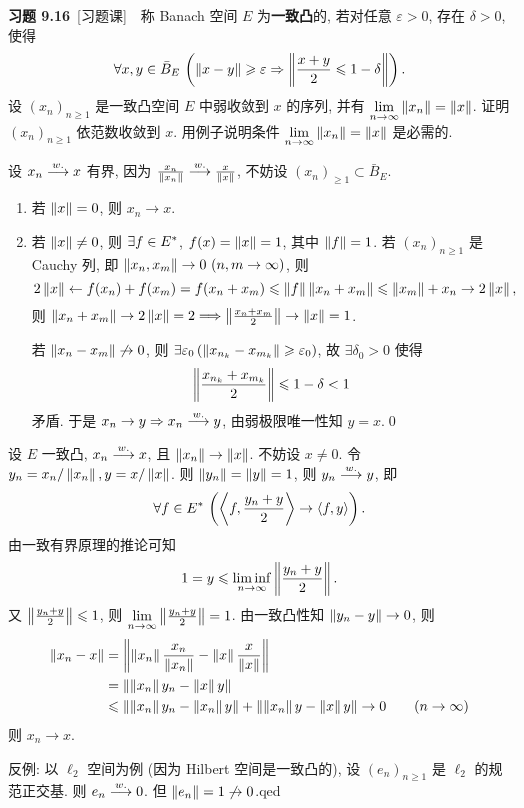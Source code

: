 	\textbf{习题 9.16}\ [习题课]\ \ 称 Banach 空间 $ E $ 为\textbf{一致凸}的, 若对任意 $ \varepsilon>0 $, 存在 $ \delta>0 $, 使得
	\[
		\forall x, y\in\bar{B}_{E}\,\left(\left\| x-y \right\|\geqslant\varepsilon\Rightarrow \left\| \frac{x+y}{2}\leqslant 1-\delta \right\|\right).
	\]
	设 $ (x_{n})_{n\geqslant1} $ 是一致凸空间 $ E $ 中弱收敛到 $ x $ 的序列, 并有 $ \lim\limits_{n\to\infty}\left\| x_{n} \right\|=\left\| x \right\| $. 证明 $ (x_{n})_{n\geqslant1} $ 依范数收敛到 $ x $. 用例子说明条件 $ \lim\limits_{n\to\infty}\left\| x_{n} \right\|=\left\| x \right\| $ 是必需的.
	\begin{Proof}
		设 $ x_{n}\overset{w.}{\longrightarrow} x $ 有界, 因为 $ \frac{x_{n}}{\left\| x_{n} \right\|}\overset{w.}{\longrightarrow}\frac{x}{\left\| x \right\|} $, 不妨设 $ (x_{n})_{\geqslant1}\subset\bar{B}_{E} $.
		\begin{enumerate}[(1)]
			\item 若 $ \left\| x \right\|=0 $, 则 $ x_{n}\to x $.
			\item 若 $ \left\| x \right\|\ne 0 $, 则 $ \exists f\in E^{*} $, $ f(x)=\left\| x \right\|=1 $, 其中 $ \left\| f \right\|=1 $. 若 $ (x_{n})_{n\geqslant1} $ 是 Cauchy 列, 即 $ \norm{x_{n}, x_{m}}\to 0\ (n, m\to\infty) $, 则
			\[
				2\left\| x \right\|\leftarrow f(x_{n})+f(x_{m})=f(x_{n}+x_{m})\leqslant\left\| f \right\|\left\| x_{n}+x_{m} \right\|\leqslant\left\| x_{m} \right\|+x_{n}\to 2\left\| x \right\|,
			\]
			则 $ \left\| x_{n}+x_{m} \right\|\to 2\left\| x \right\|=2\Longrightarrow \left\| \frac{x_{n}+x_{m}}{2} \right\|\to \left\| x \right\|=1 $.

			若 $ \left\| x_{n}-x_{m} \right\|\not\to 0 $, 则 $ \exists\varepsilon_{0}\,(\left\| x_{n_{k}}-x_{m_{k}} \right\|\geqslant\varepsilon_{0}) $, 故 $ \exists \delta_{0}>0 $ 使得
			\[
				\left\| \frac{x_{n_{k}}+x_{m_{k}}}{2} \right\|\leqslant1-\delta<1
			\]
			矛盾. 于是 $ x_{n}\to y\Rightarrow x_{n}\overset{w.}{\longrightarrow} y $, 由弱极限唯一性知 $ y=x $.\qed
		\end{enumerate}
	\end{Proof}
	\begin{Proof}[另证]
		设 $ E $ 一致凸, $ x_{n}\overset{w.}{\longrightarrow} x $, 且 $ \left\| x_{n} \right\|\to\left\| x \right\| $. 不妨设 $ x\ne 0 $. 令 $ y_{n}=x_{n}/\left\| x_{n} \right\|, y=x/\left\| x \right\| $. 则 $ \left\| y_{n} \right\|=\left\| y \right\|=1 $, 则 $ y_{n}\overset{w.}{\longrightarrow} y $, 即
		\[
			\forall f\in E^{*}\,\left( \left\langle f, \frac{y_{n}+y}{2} \right\rangle\to \left\langle f, y \right\rangle \right).
		\]
		由一致有界原理的推论可知
		\[
			1=y\leqslant\liminf_{n\to\infty}\left\| \frac{y_{n}+y}{2} \right\|.
		\]
		又 $ \left\| \frac{y_{n}+y}{2} \right\|\leqslant1 $, 则 $ \lim\limits_{n\to\infty}\left\| \frac{y_{n}+y}{2} \right\|=1 $. 由一致凸性知 $ \left\| y_{n}-y \right\|\to 0 $, 则
		\[
			\begin{aligned}
				\left\| x_{n}-x \right\| & = \left\| \left\| x_{n} \right\|\frac{x_{n}}{\left\| x_{n} \right\|}-\left\| x \right\|\frac{x}{\left\| x \right\|} \right\|\\
				& = \left\| \left\| x_{n} \right\|y_{n}-\left\| x \right\|y \right\|\\
				& \leqslant\left\| \left\| x_{n} \right\|y_{n}-\left\| x_{n} \right\|y \right\|+\left\| \left\| x_{n} \right\|y-\left\| x \right\|y \right\|\to 0\qquad (n\to\infty)
			\end{aligned}
		\]
		则 $ x_{n}\to x $.

		反例: 以 $ \ell_{2} $ 空间为例 (因为 Hilbert 空间是一致凸的), 设 $ (e_{n})_{n\geqslant1} $ 是 $ \ell_{2} $ 的规范正交基. 则 $ e_{n}\overset{w.}{\longrightarrow} 0 $. 但 $ \left\| e_{n} \right\|=1\not\to 0 $.qed
	\end{Proof}

